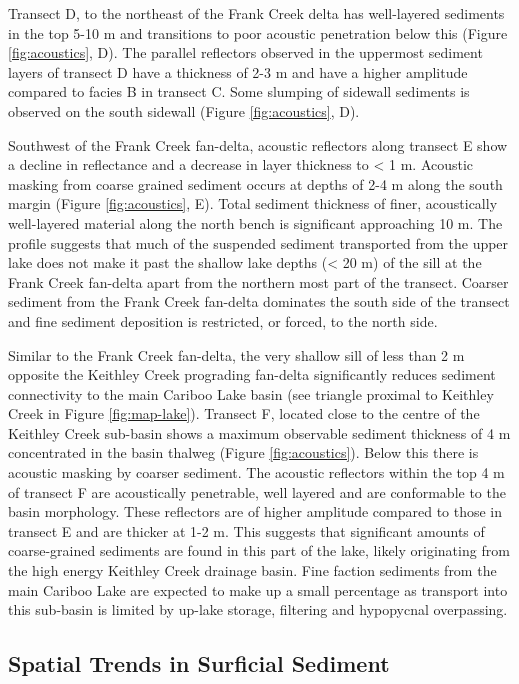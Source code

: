 \documentclass[Royal,times,doublespace,sageh]{sagej}
\begin{document}
Transect D, to the northeast of the Frank Creek delta has well-layered
sediments in the top 5-10 m and transitions to poor acoustic penetration
below this (Figure \ref{fig:acoustics}, D). The parallel reflectors
observed in the uppermost sediment layers of transect D have a thickness
of 2-3 m and have a higher amplitude compared to facies B in transect C.
Some slumping of sidewall sediments is observed on the south sidewall
(Figure \ref{fig:acoustics}, D).

Southwest of the Frank Creek fan-delta, acoustic reflectors along
transect E show a decline in reflectance and a decrease in layer
thickness to \textless{} 1 m. Acoustic masking from coarse grained
sediment occurs at depths of 2-4 m along the south margin (Figure
\ref{fig:acoustics}, E). Total sediment thickness of finer, acoustically
well-layered material along the north bench is significant approaching
10 m. The profile suggests that much of the suspended sediment
transported from the upper lake does not make it past the shallow lake
depths (\textless{} 20 m) of the sill at the Frank Creek fan-delta apart
from the northern most part of the transect. Coarser sediment from the
Frank Creek fan-delta dominates the south side of the transect and fine
sediment deposition is restricted, or forced, to the north side.

Similar to the Frank Creek fan-delta, the very shallow sill of less than
2 m opposite the Keithley Creek prograding fan-delta significantly
reduces sediment connectivity to the main Cariboo Lake basin (see
triangle proximal to Keithley Creek in Figure \ref{fig:map-lake}).
Transect F, located close to the centre of the Keithley Creek sub-basin
shows a maximum observable sediment thickness of 4 m concentrated in the
basin thalweg (Figure \ref{fig:acoustics}). Below this there is acoustic
masking by coarser sediment. The acoustic reflectors within the top 4 m
of transect F are acoustically penetrable, well layered and are
conformable to the basin morphology. These reflectors are of higher
amplitude compared to those in transect E and are thicker at 1-2 m. This
suggests that significant amounts of coarse-grained sediments are found
in this part of the lake, likely originating from the high energy
Keithley Creek drainage basin. Fine faction sediments from the main
Cariboo Lake are expected to make up a small percentage as transport
into this sub-basin is limited by up-lake storage, filtering and
hypopycnal overpassing.

\hypertarget{spatial}{%
\subsection{Spatial Trends in Surficial Sediment}\label{spatial}}
\end{document}

